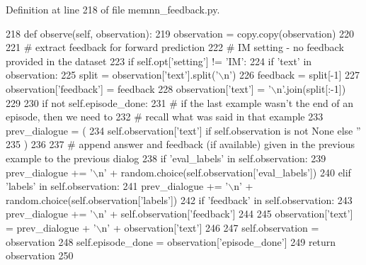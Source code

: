 Definition at line 218 of file memnn\+\_\+feedback.\+py.


\begin{DoxyCode}
218     \textcolor{keyword}{def }observe(self, observation):
219         observation = copy.copy(observation)
220 
221         \textcolor{comment}{# extract feedback for forward prediction}
222         \textcolor{comment}{# IM setting - no feedback provided in the dataset}
223         \textcolor{keywordflow}{if} self.opt[\textcolor{stringliteral}{'setting'}] != \textcolor{stringliteral}{'IM'}:
224             \textcolor{keywordflow}{if} \textcolor{stringliteral}{'text'} \textcolor{keywordflow}{in} observation:
225                 split = observation[\textcolor{stringliteral}{'text'}].split(\textcolor{stringliteral}{'\(\backslash\)n'})
226                 feedback = split[-1]
227                 observation[\textcolor{stringliteral}{'feedback'}] = feedback
228                 observation[\textcolor{stringliteral}{'text'}] = \textcolor{stringliteral}{'\(\backslash\)n'}.join(split[:-1])
229 
230         \textcolor{keywordflow}{if} \textcolor{keywordflow}{not} self.episode\_done:
231             \textcolor{comment}{# if the last example wasn't the end of an episode, then we need to}
232             \textcolor{comment}{# recall what was said in that example}
233             prev\_dialogue = (
234                 self.observation[\textcolor{stringliteral}{'text'}] \textcolor{keywordflow}{if} self.observation \textcolor{keywordflow}{is} \textcolor{keywordflow}{not} \textcolor{keywordtype}{None} \textcolor{keywordflow}{else} \textcolor{stringliteral}{''}
235             )
236 
237             \textcolor{comment}{# append answer and feedback (if available) given in the previous example to the previous
       dialog}
238             \textcolor{keywordflow}{if} \textcolor{stringliteral}{'eval\_labels'} \textcolor{keywordflow}{in} self.observation:
239                 prev\_dialogue += \textcolor{stringliteral}{'\(\backslash\)n'} + random.choice(self.observation[\textcolor{stringliteral}{'eval\_labels'}])
240             \textcolor{keywordflow}{elif} \textcolor{stringliteral}{'labels'} \textcolor{keywordflow}{in} self.observation:
241                 prev\_dialogue += \textcolor{stringliteral}{'\(\backslash\)n'} + random.choice(self.observation[\textcolor{stringliteral}{'labels'}])
242             \textcolor{keywordflow}{if} \textcolor{stringliteral}{'feedback'} \textcolor{keywordflow}{in} self.observation:
243                 prev\_dialogue += \textcolor{stringliteral}{'\(\backslash\)n'} + self.observation[\textcolor{stringliteral}{'feedback'}]
244 
245             observation[\textcolor{stringliteral}{'text'}] = prev\_dialogue + \textcolor{stringliteral}{'\(\backslash\)n'} + observation[\textcolor{stringliteral}{'text'}]
246 
247         self.observation = observation
248         self.episode\_done = observation[\textcolor{stringliteral}{'episode\_done'}]
249         \textcolor{keywordflow}{return} observation
250 
\end{DoxyCode}
